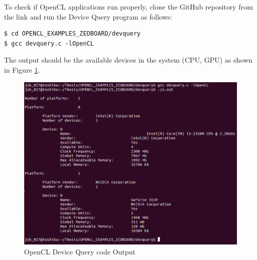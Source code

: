 To check if OpenCL applications run properly, clone the GitHub repository from the link \cite{devquery} and run the Device Query program as follows:   
\begin{scriptsize}
\linuxbash
\begin{lstlisting}
$ cd OPENCL_EXAMPLES_ZEDBOARD/devquery 
$ gcc devquery.c -lOpenCL
\end{lstlisting}
\end{scriptsize}
The output should be the available devices in the system (CPU, GPU) as shown in Figure \ref{fig:DeviceQuery}.
\begin{figure}[h!]
\centering
\includegraphics[width=0.7\linewidth]{figures/DeviceQuery.png}
\caption{OpenCL Device Query code Output
\cite{devquery}}
\label{fig:DeviceQuery}
\end{figure}
